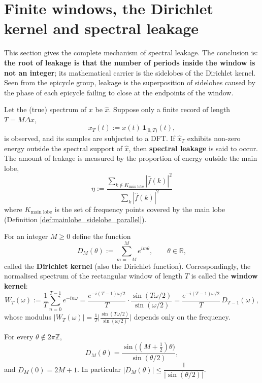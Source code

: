 \section{Finite windows, the Dirichlet kernel and spectral leakage}\label{sec:window_dirichlet}

This section gives the complete mechanism of spectral leakage. The conclusion is: \textbf{the root of leakage is that the number of periods inside the window is not an integer}; its mathematical carrier is the sidelobes of the Dirichlet kernel. Seen from the epicycle group, leakage is the superposition of sidelobes caused by the phase of each epicycle failing to close at the endpoints of the window.

\begin{definition}\label{def:spectral_leakage}
Let the (true) spectrum of $x$ be $\hat x$. Suppose only a finite record of length $T=M\Delta x$,
\[
x_T(t):=x(t)\,\mathbf{1}_{[0,T)}(t),
\]
is observed, and its samples are subjected to a DFT. If $\hat x_T$ exhibits non-zero energy outside the spectral support of $\hat x$, then \textbf{spectral leakage} is said to occur. The amount of leakage is measured by the proportion of energy outside the main lobe,
\[
\eta:=\frac{\displaystyle\sum_{k\notin K_{\text{main lobe}}}|\hat f(k)|^2}{\displaystyle\sum_{k}|\hat f(k)|^2}
\]
where $K_{\text{main lobe}}$ is the set of frequency points covered by the main lobe (Definition \ref{def:mainlobe_sidelobe_parallel}).
\end{definition}

\begin{definition}\label{def:dirichlet_kernel_parallel}
For an integer $M\ge0$ define the function
\[
D_M(\theta):=\sum_{m=-M}^{M}e^{im\theta},\qquad \theta\in\mathbb{R},
\]
called the \textbf{Dirichlet kernel} (also the Dirichlet function). Correspondingly, the normalised spectrum of the rectangular window of length $T$ is called the \textbf{window kernel}:
\[
W_T(\omega):=\frac{1}{T}\sum_{n=0}^{T-1}e^{-in\omega}
=\frac{e^{-i(T-1)\omega/2}}{T}\cdot\frac{\sin(T\omega/2)}{\sin(\omega/2)}
=\frac{e^{-i(T-1)\omega/2}}{T}\,D_{T-1}(\omega),
\]
whose modulus $|W_T(\omega)|=\frac{1}{T}\big|\frac{\sin(T\omega/2)}{\sin(\omega/2)}\big|$ depends only on the frequency.
\end{definition}

\begin{lemma}\label{lem:dirichlet_kernel_closed_form}
For every $\theta\notin2\pi\mathbb{Z}$,
\[
D_M(\theta)=\frac{\sin\big((M+\tfrac12)\theta\big)}{\sin(\theta/2)},
\]
and $D_M(0)=2M+1$. In particular $|D_M(\theta)|\le\dfrac{1}{|\sin(\theta/2)|}$.
\end{lemma}

